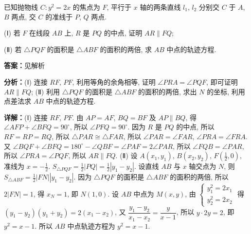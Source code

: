 \begin{question}[points=12]
已知抛物线 $C: y^2=2x$ 的焦点为 $F$, 平行于 $x$ 轴的两条直线 $l_1$, $l_2$ 分别交 $C$ 于 $A$, $B$ 两点, 交 $C$ 的准线于 $P$, $Q$ 两点.

(Ⅰ) 若 $F$ 在线段 $AB$ 上, $R$ 是 $PQ$ 的中点, 证明 $AR\parallel FQ$;

(Ⅱ) 若 $\triangle PQF$ 的面积是 $\triangle ABF$ 的面积的两倍, 求 $AB$ 中点的轨迹方程.
\begin{solution}
\textbf{答案：}见解析

\textbf{分析：}(Ⅰ) 连接 $RF$, $PF$, 利用等角的余角相等, 证明 $\angle PRA=\angle PQF$, 即可证明 $AR\parallel FQ$;
(Ⅱ) 利用 $\triangle PQF$ 的面积是 $\triangle ABF$ 的面积的两倍, 求出 $N$ 的坐标, 利用点差法求 $AB$ 中点的轨迹方程.

\textbf{详解：}(Ⅰ) 连接 $RF$, $PF$. 由 $AP=AF$, $BQ=BF$ 及 $AP\parallel BQ$, 得 $\angle AFP+\angle BFQ=90^{\circ}$, 所以 $\angle PFQ=90^{\circ}$. 因为 $R$ 是 $PQ$ 的中点, 所以 $RF=RP=RQ$, 所以 $\triangle PAR\cong\triangle FAR$, 所以 $\angle PAR=\angle FAR$, $\angle PRA=\angle FRA$. 又 $\angle BQF+\angle BFQ=180^{\circ}-\angle QBF=\angle PAF=2\angle PAR$, 所以 $\angle FQB=\angle PAR$, 所以 $\angle PRA=\angle PQF$, 所以 $AR\parallel FQ$.
(Ⅱ) 设 $A(x_1,y_1)$, $B(x_2,y_2)$, $F(\frac{1}{2},0)$, 准线为 $x=-\frac{1}{2}$. $S_{\triangle PQF}=\frac{1}{2}|PQ|=\frac{1}{2}|y_1-y_2|$. 设直线 $AB$ 与 $x$ 轴交点为 $N$, 则 $S_{\triangle ABF}=\frac{1}{2}|FN||y_1-y_2|$. 因为 $\triangle PQF$ 的面积是 $\triangle ABF$ 的面积的两倍, 所以 $2|FN|=1$, 得 $x_N=1$, 即 $N(1,0)$. 设 $AB$ 中点为 $M(x,y)$, 由 $\begin{cases}y_1^2=2x_1\\ y_2^2=2x_2\end{cases}$ 得 $(y_1-y_2)(y_1+y_2)=2(x_1-x_2)$, 又 $\dfrac{y_1-y_2}{x_1-x_2}=\dfrac{y}{x-1}$, 所以 $y\cdot2y=2$, 即 $y^2=x-1$. 所以 $AB$ 中点轨迹方程为 $y^2=x-1$.
\end{solution}
\end{question}

